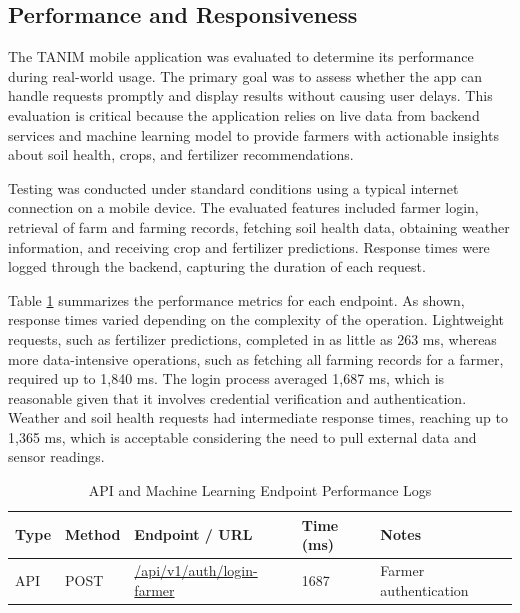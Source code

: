 {	\subsection{Performance and Responsiveness}
	
	The TANIM mobile application was evaluated to determine its performance during real-world usage. The primary goal was to assess whether the app can handle requests promptly and display results without causing user delays. This evaluation is critical because the application relies on live data from backend services and machine learning model to provide farmers with actionable insights about soil health, crops, and fertilizer recommendations.
	
	Testing was conducted under standard conditions using a typical internet connection on a mobile device. The evaluated features included farmer login, retrieval of farm and farming records, fetching soil health data, obtaining weather information, and receiving crop and fertilizer predictions. Response times were logged through the backend, capturing the duration of each request.
	
	Table \ref{tab:api_logs} summarizes the performance metrics for each endpoint. As shown, response times varied depending on the complexity of the operation. Lightweight requests, such as fertilizer predictions, completed in as little as 263 ms, whereas more data-intensive operations, such as fetching all farming records for a farmer, required up to 1,840 ms. The login process averaged 1,687 ms, which is reasonable given that it involves credential verification and authentication. Weather and soil health requests had intermediate response times, reaching up to 1,365 ms, which is acceptable considering the need to pull external data and sensor readings.
	
	\begin{table}[H]
		\centering
		\caption{API and Machine Learning Endpoint Performance Logs}
		\label{tab:api_logs}
		
		\small
		\renewcommand{\arraystretch}{1.5}
		
		\begin{tabularx}{\textwidth}{l l X l p{3.5cm}}
			\toprule
			\textbf{Type} & \textbf{Method} & \textbf{Endpoint / URL} & \textbf{Time (ms)} & \textbf{Notes} \\
			\midrule
			
			API & POST & \url{/api/v1/auth/login-farmer} & 1687 & Farmer authentication \\
			

\end{tabularx}
\end{table}}
